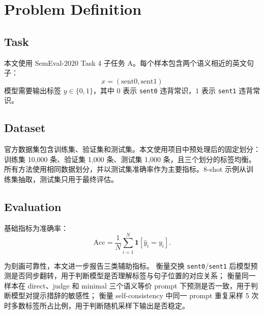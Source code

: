 \section{Problem Definition}

\subsection{Task}

本文使用 SemEval-2020 Task 4 \comve 子任务 A。每个样本包含两个语义相近的英文句子：
\[
x = (\text{sent0}, \text{sent1})
\]
模型需要输出标签 \(y \in \{0,1\}\)，其中 \(0\) 表示 \texttt{sent0} 违背常识，\(1\) 表示 \texttt{sent1} 违背常识。

\subsection{Dataset}

官方数据集包含训练集、验证集和测试集。本文使用项目中预处理后的固定划分：训练集 10,000 条、验证集 1,000 条、测试集 1,000 条，且三个划分的标签均衡。所有方法使用相同数据划分，并以测试集准确率作为主要指标。8-shot 示例从训练集抽取，测试集只用于最终评估。

\subsection{Evaluation}

基础指标为准确率：
\[
\mathrm{Acc} = \frac{1}{N}\sum_{i=1}^{N}\mathbf{1}[\hat{y}_i = y_i].
\]

为刻画可靠性，本文进一步报告三类辅助指标。 衡量交换 \texttt{sent0}/\texttt{sent1} 后模型预测是否同步翻转，用于判断模型是否理解标签与句子位置的对应关系； 衡量同一样本在 direct、judge 和 minimal 三个语义等价 prompt 下预测是否一致，用于判断模型对提示措辞的敏感性； 衡量 self-consistency 中同一 prompt 重复采样 5 次时多数标签所占比例，用于判断随机采样下输出是否稳定。
